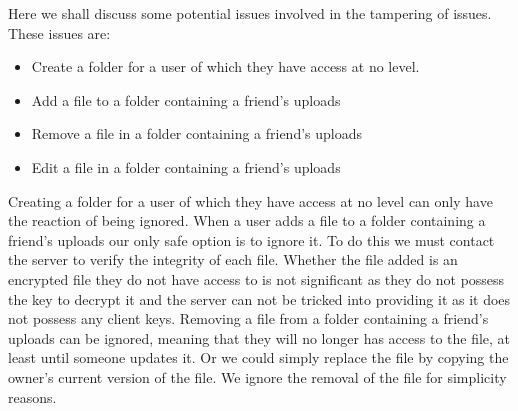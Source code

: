 \documentclass[12pt, titlepage]{article}
\begin{document}
\newline
\newline \indent Here we shall discuss some potential issues involved in the tampering of issues. These issues are:
\begin{itemize}
	\item Create a folder for a user of which they have access at no level.
	\item Add a file to a folder containing a friend's uploads
	\item Remove a file in a folder containing a friend's uploads
	\item Edit a file in a folder containing a friend's uploads
\end{itemize}
Creating a folder for a user of which they have access at no level can only have the reaction of being ignored.
\newline \indent When a user adds a file to a folder containing a friend's uploads our only safe option is to ignore it. To do this we must contact the server to verify the integrity of each file. Whether the file added is an encrypted file they do not have access to is not significant as they do not possess the key to decrypt it and the server can not be tricked into providing it as it does not possess any client keys.
\newline \indent Removing a file from a folder containing a friend's uploads can be ignored, meaning that they will no longer has access to the file, at least until someone updates it. Or we could simply replace the file by copying the owner's current version of the file. We ignore the removal of the file for simplicity reasons.

\newpage
\end{document}
